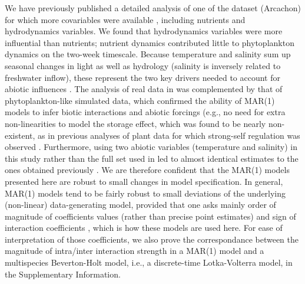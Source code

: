 \documentclass[10pt]{article}
\begin{document}
We have previously published a detailed analysis of one of the dataset
(Arcachon) for which more covariables were available \citep{barraquand_coastal_2018},
including nutrients and hydrodynamics variables. We found that hydrodynamics
variables were more influential than nutrients; nutrient dynamics
contributed little to phytoplankton dynamics on the two-week timescale.
Because temperature and salinity sum up seasonal changes in light
as well as hydrology (salinity is inversely related to freshwater
inflow), these represent the two key drivers needed to account for
abiotic influences \citep{scheef_inferring_2013}. The analysis
of real data in \citet{barraquand_coastal_2018}
was complemented by that of phytoplankton-like simulated data, which
confirmed the ability of MAR(1) models to infer biotic interactions
and abiotic forcings (e.g., no need for extra non-linearities to model
the storage effect, which was found to be nearly non-existent, as
in previous analyses of plant data for which strong-self regulation
was observed \citep{adler_coexistence_2010,ellner_how_2016}.
Furthermore, using two abiotic variables (temperature and salinity)
in this study rather than the full set used in \citet{barraquand_coastal_2018}
led to almost identical estimates to the ones obtained previously \citep{barraquand_coastal_2018}.
We are therefore confident that the MAR(1) models presented here are
robust to small changes in model specification. In general, MAR(1)
models tend to be fairly robust to small deviations of the underlying
(non-linear) data-generating model, provided that one asks mainly
order of magnitude of coefficients values (rather than precise point
estimates) and sign of interaction coefficients \citep{certain_how_2018},
which is how these models are used here. For ease of interpretation
of those coefficients, we also prove the correspondance between the
magnitude of intra/inter interaction strength in a MAR(1) model and
a multispecies Beverton-Holt model, i.e., a discrete-time Lotka-Volterra
model, in the Supplementary Information.
\end{document}
